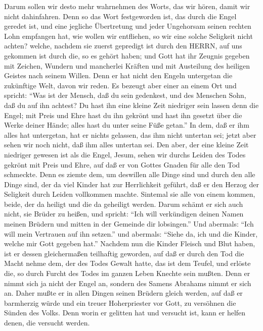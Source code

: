  Darum sollen wir desto mehr wahrnehmen des Worts, das wir
hören, damit wir nicht dahinfahren.  Denn so das Wort
festgeworden ist, das durch die Engel geredet ist, und eine jegliche
Übertretung und jeder Ungehorsam seinen rechten Lohn empfangen hat,
 wie wollen wir entfliehen, so wir eine solche Seligkeit
nicht achten? welche, nachdem sie zuerst gepredigt ist durch den HERRN,
auf uns gekommen ist durch die, so es gehört haben;  und
Gott hat ihr Zeugnis gegeben mit Zeichen, Wundern und mancherlei Kräften
und mit Austeilung des heiligen Geistes nach seinem Willen. 
Denn er hat nicht den Engeln untergetan die zukünftige Welt, davon wir
reden.  Es bezeugt aber einer an einem Ort und spricht:
``Was ist der Mensch, daß du sein gedenkest, und des Menschen Sohn, daß
du auf ihn achtest?  Du hast ihn eine kleine Zeit niedriger
sein lassen denn die Engel; mit Preis und Ehre hast du ihn gekrönt und
hast ihn gesetzt über die Werke deiner Hände;  alles hast du
unter seine Füße getan.'' In dem, daß er ihm alles hat untergetan, hat
er nichts gelassen, das ihm nicht untertan sei; jetzt aber sehen wir
noch nicht, daß ihm alles untertan sei.  Den aber, der eine
kleine Zeit niedriger gewesen ist als die Engel, Jesum, sehen wir durchs
Leiden des Todes gekrönt mit Preis und Ehre, auf daß er von Gottes
Gnaden für alle den Tod schmeckte.  Denn es ziemte dem, um
deswillen alle Dinge sind und durch den alle Dinge sind, der da viel
Kinder hat zur Herrlichkeit geführt, daß er den Herzog der Seligkeit
durch Leiden vollkommen machte.  Sintemal sie alle von
einem kommen, beide, der da heiligt und die da geheiligt werden. Darum
schämt er sich auch nicht, sie Brüder zu heißen,  und
spricht: ``Ich will verkündigen deinen Namen meinen Brüdern und mitten
in der Gemeinde dir lobsingen.''  Und abermals: ``Ich will
mein Vertrauen auf ihn setzen.'' und abermals: ``Siehe da, ich und die
Kinder, welche mir Gott gegeben hat.''  Nachdem nun die
Kinder Fleisch und Blut haben, ist er dessen gleichermaßen teilhaftig
geworden, auf daß er durch den Tod die Macht nehme dem, der des Todes
Gewalt hatte, das ist dem Teufel,  und erlöste die, so
durch Furcht des Todes im ganzen Leben Knechte sein mußten.
 Denn er nimmt sich ja nicht der Engel an, sondern des
Samens Abrahams nimmt er sich an.  Daher mußte er in allen
Dingen seinen Brüdern gleich werden, auf daß er barmherzig würde und ein
treuer Hoherpriester vor Gott, zu versöhnen die Sünden des Volks.
 Denn worin er gelitten hat und versucht ist, kann er
helfen denen, die versucht werden.

